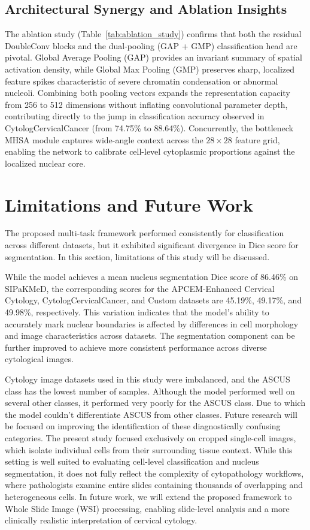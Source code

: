 \documentclass[pdflatex,sn-nature]{sn-jnl}%
\theoremstyle{thmstyleone}%
\theoremstyle{thmstyletwo}%
\theoremstyle{thmstylethree}%
\begin{document}
\subsection{Architectural Synergy and Ablation Insights}
The ablation study (Table~\ref{tab:ablation_study}) confirms that both the residual DoubleConv blocks and the dual-pooling (GAP + GMP) classification head are pivotal. Global Average Pooling (GAP) provides an invariant summary of spatial activation density, while Global Max Pooling (GMP) preserves sharp, localized feature spikes characteristic of severe chromatin condensation or abnormal nucleoli. Combining both pooling vectors expands the representation capacity from 256 to 512 dimensions without inflating convolutional parameter depth, contributing directly to the jump in classification accuracy observed in CytologCervicalCancer (from 74.75\% to 88.64\%). Concurrently, the bottleneck MHSA module captures wide-angle context across the $28 \times 28$ feature grid, enabling the network to calibrate cell-level cytoplasmic proportions against the localized nuclear core.


\section{Limitations and Future Work}
The proposed multi-task framework performed consistently for classification across different datasets, but it exhibited significant divergence in Dice score for segmentation. In this section, limitations of this study will be discussed.

While the model achieves a mean nucleus segmentation Dice score of 86.46\% on SIPaKMeD, the corresponding scores for the APCEM-Enhanced Cervical Cytology, CytologCervicalCancer, and Custom datasets are 45.19\%, 49.17\%, and 49.98\%, respectively. This variation indicates that the model's ability to accurately mark nuclear boundaries is affected by differences in cell morphology and image characteristics across datasets. The segmentation component can be further improved to achieve more consistent performance across diverse cytological images.

Cytology image datasets used in this study were imbalanced, and the ASCUS class has the lowest number of samples. Although the model performed well on several other classes, it performed very poorly for the ASCUS class. Due to which the model couldn't differentiate ASCUS from other classes. Future research will be focused on improving the identification of these diagnostically confusing categories. The present study focused exclusively on cropped single-cell images, which isolate individual cells from their surrounding tissue context. While this setting is well suited to evaluating cell-level classification and nucleus segmentation, it does not fully reflect the complexity of cytopathology workflows, where pathologists examine entire slides containing thousands of overlapping and heterogeneous cells. In future work, we will extend the proposed framework to Whole Slide Image (WSI) processing, enabling slide-level analysis and a more clinically realistic interpretation of cervical cytology.
\end{document}
